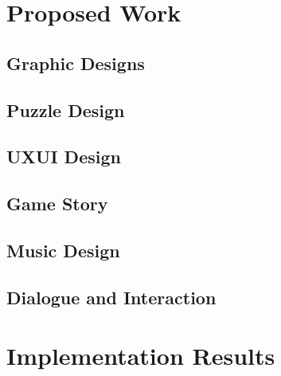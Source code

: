 \documentclass[12pt,oneside,openright,a4paper]{explo-english-project}
\begin{document}

\chapter{Proposed Work}


\section{Graphic Designs}


\section{Puzzle Design}


\section{UXUI Design}


\section{Game Story}


\section{Music Design}


\section{Dialogue and Interaction}




\chapter{Implementation Results}


% 
\end{document}
